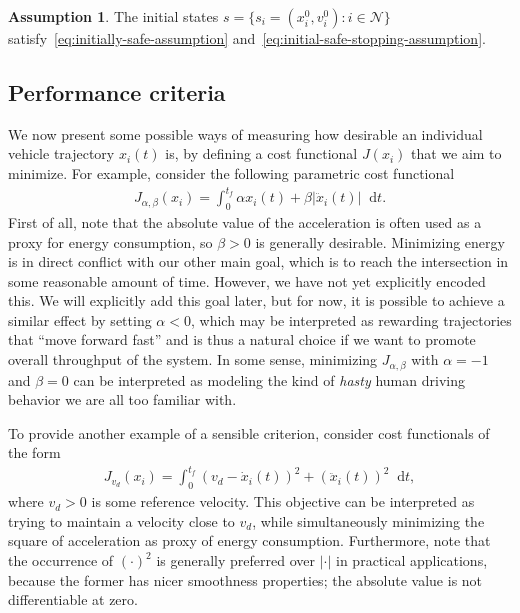 \documentclass{report}
\newcounter{mycomment}
\newcommand{\comment}[2][]{%
    \refstepcounter{mycomment}%
    {%
        \setstretch{0.7}%
        \StrLeft{#2}{60}[\shortcaption]%
        \todo[%
        color={red!100!green!33},%
        size=\small,%
        caption={\protect\hypertarget{todo\themycomment}{}\textit{\thesubsection}%
        \hspace{1.0em}{\shortcaption}~\textit{[\themycomment]}}, #1]%
        {%
        #2~\hyperlink{todo\themycomment}{\textit{[\themycomment]}}}
    }%
}
\theoremstyle{definition}
\newtheorem{assump}{Assumption}[chapter]
\theoremstyle{plain}
\newcommand*\diff{\mathop{}\!\mathrm{d}}
\begin{document}
\begin{assump}\label{assump:feasible}
  The initial states $s=\{s_i = (x_i^0,v_i^0) : i \in \mathcal{N} \}$
  satisfy~\eqref{eq:initially-safe-assumption}
  and~\eqref{eq:initial-safe-stopping-assumption}.
\end{assump}


\subsection{Performance criteria}\label{sec:criteria}
We now present some possible ways of measuring how desirable an individual
vehicle trajectory $x_{i}(t)$ is, by defining a cost functional $J(x_{i})$ that
we aim to minimize.
%
For example, consider the following parametric cost functional
\begin{align}
  J_{\alpha,\beta}(x_{i}) = \int_{0}^{t_{f}} \alpha x_{i}(t) + \beta |\ddot{x}_{i}(t)| \diff t .
\end{align}
%
First of all, note that the absolute value of the acceleration is often used as
a proxy for energy consumption, so $\beta > 0$ is generally desirable.
%
%
Minimizing energy is in direct conflict with our other main goal, which is to
reach the intersection in some reasonable amount of time. However, we have not
yet explicitly encoded this.
%
We will explicitly add this goal later, but for now, it is possible to achieve a
similar effect by setting $\alpha < 0$, which may be interpreted as rewarding
trajectories that ``move forward fast'' and is thus a natural choice if we want
to promote overall throughput of the system.
%
In some sense, minimizing $J_{\alpha,\beta}$ with $\alpha = -1$ and $\beta = 0$ can be interpreted
as modeling the kind of \emph{hasty} human driving behavior we are all too familiar with.

To provide another example of a sensible criterion, consider cost functionals of
the form
\begin{align}\label{eq:energy-objective}
  J_{v_{d}}(x_{i}) = \int_{0}^{t_{f}} {(v_{d} - \dot{x}_{i}(t))}^{2} + {(\ddot{x}_{i}(t))}^{2} \diff t ,
\end{align}
where $v_{d} > 0$ is some reference velocity. This objective can be interpreted
as trying to maintain a velocity close to $v_{d}$, while simultaneously
minimizing the square of acceleration as proxy of energy consumption.
%
Furthermore, note that the occurrence of $(\cdot)^2$ is generally preferred over
$|\cdot|$ in practical applications, because the former has nicer smoothness
properties; the absolute value is not differentiable at zero.
\end{document}

